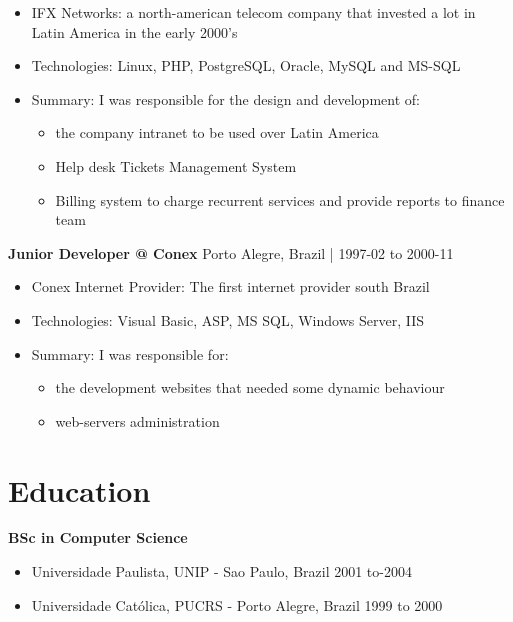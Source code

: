 \documentclass[margin,a4paper]{res}
\def\tightlist{}
\begin{document}
{\begin{itemize}
\tightlist
\item
  IFX Networks: a north-american telecom company that invested a lot in
  Latin America in the early 2000's
\item
  Technologies: Linux, PHP, PostgreSQL, Oracle, MySQL and MS-SQL
\item
  Summary: I was responsible for the design and development of:

  \begin{itemize}
  \tightlist
  \item
    the company intranet to be used over Latin America
  \item
    Help desk Tickets Management System
  \item
    Billing system to charge recurrent services and provide reports to
    finance team
  \end{itemize}
\end{itemize}

\textbf{Junior Developer @ Conex} \hfill Porto Alegre, Brazil | 1997-02 to 2000-11

\begin{itemize}
\tightlist
\item
  Conex Internet Provider: The first internet provider south Brazil
\item
  Technologies: Visual Basic, ASP, MS SQL, Windows Server, IIS
\item
  Summary: I was responsible for:

  \begin{itemize}
  \tightlist
  \item
    the development websites that needed some dynamic behaviour
  \item
    web-servers administration
  \end{itemize}
\end{itemize}
\pagebreak

\hypertarget{education}{%
\section{Education}\label{education}}

\textbf{BSc in Computer Science}

\begin{itemize}
  \tightlist
\item
  Universidade Paulista, UNIP - Sao Paulo, Brazil \hfill 2001 to-2004
\item
  Universidade Católica, PUCRS - Porto Alegre, Brazil \hfill 1999 to 2000
\end{itemize}

}
\end{document}
